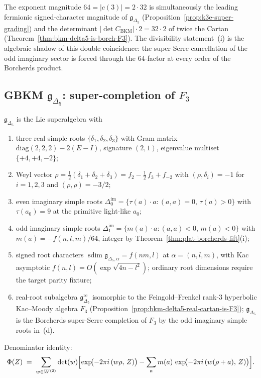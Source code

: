 \begin{remark}
\label{rem:k3e-platonic-64-rigid}
The exponent magnitude $64 = |c(3)| = 2 \cdot 32$ is simultaneously the leading fermionic signed-character magnitude of $\mathfrak{g}_{\Delta_5}$ (Proposition~\ref{prop:k3e-super-grading}) and the determinant $|\det C_{\mathrm{BKM}}|\cdot 2 = 32 \cdot 2$ of twice the Cartan (Theorem~\ref{thm:bkm-delta5-is-borch-F3}). The divisibility statement~(i) is the algebraic shadow of this double coincidence: the super-Serre cancellation of the odd imaginary sector is forced through the $64$-factor at every order of the Borcherds product.
\end{remark}

\subsection{GBKM \texorpdfstring{$\mathfrak{g}_{\Delta_5}$}{g-Delta-5}: super-completion of \texorpdfstring{$F_3$}{F-3}}
\label{subsec:k3e-platonic-gDelta5}

\begin{theorem}
\label{thm:plat-gDelta5}
$\mathfrak{g}_{\Delta_5}$ is the Lie superalgebra with
\begin{enumerate}[label=\textup{(\alph*)}]
\item three real simple roots $\{\delta_1, \delta_2, \delta_3\}$ with Gram matrix $\mathrm{diag}(2, 2, 2) - 2(E - I)$, signature $(2, 1)$, eigenvalue multiset $\{+4, +4, -2\}$;
\item Weyl vector $\rho = \tfrac{1}{2}(\delta_1 + \delta_2 + \delta_3) = f_2 - \tfrac{1}{2}\,f_3 + f_{-2}$ with $(\rho, \delta_i) = -1$ for $i = 1, 2, 3$ and $(\rho, \rho) = -3/2$;
\item even imaginary simple roots $\Delta^{\mathrm{im}}_0 = \{\tau(a) \cdot a : (a, a) = 0,\, \tau(a) > 0\}$ with $\tau(a_0) = 9$ at the primitive light-like $a_0$;
\item odd imaginary simple roots $\Delta^{\mathrm{im}}_1 = \{m(a) \cdot a : (a, a) < 0,\, m(a) < 0\}$ with $m(a) = -f(n, l, m)/64$, integer by Theorem~\ref{thm:plat-borcherds-lift}(i);
\item signed root characters \(\operatorname{sdim}\mathfrak g_{\Delta_5,\alpha}=f(nm, l)\) at $\alpha = (n, l, m)$, with Kac asymptotic \(f(n, l) = O(\exp\sqrt{4n - l^2})\); ordinary root dimensions require the target parity fixture;
\item real-root subalgebra $\mathfrak{g}_{\Delta_5}^{\mathrm{re}}$ isomorphic to the Feingold--Frenkel rank-$3$ hyperbolic Kac--Moody algebra $F_3$ (Proposition~\ref{prop:bkm-delta5-real-cartan-is-F3}); $\mathfrak{g}_{\Delta_5}$ is the Borcherds super-Serre completion of $F_3$ by the odd imaginary simple roots in~(d).
\end{enumerate}
Denominator identity:
\[
 \Phi(Z) \;=\; \sum_{w \in W^{(2)}} \det(w)\Bigl[\exp\!\bigl(-2\pi i\,(w\rho,\, Z)\bigr) - \sum_{a} m(a)\,\exp\!\bigl(-2\pi i\,(w(\rho + a),\, Z)\bigr)\Bigr].
\]
\end{theorem}

